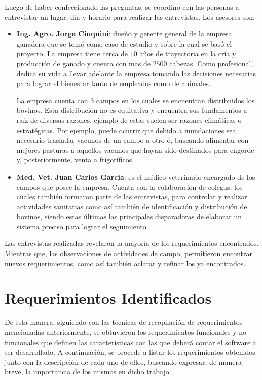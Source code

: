 \documentclass[11pt,oneside]{book}
\begin{document}
\newpage
Luego de haber confeccionado las preguntas, se coordino con las personas a entrevistar un lugar, día y horario para realizar las entrevistas. Los asesores son:
\begin{itemize}
\item \textbf{Ing. Agro. Jorge Cinquini}: dueño y gerente general de la empresa ganadera que se tomó como caso de estudio y sobre la cual se basó el proyecto. La empresa tiene cerca de $10$ años de trayectoria en la cría y producción de ganado y cuenta con mas de $2500$ cabezas. Como profesional, dedica su vida a llevar adelante la empresa tomando las decisiones necesarias para lograr el bienestar tanto de empleados como de animales. 

La empresa cuenta con $3$ campos en los cuales se encuentran distribuidos los bovinos. Esta distribución no es equitativa y encuentra sus fundamentos a raíz de diversas razones, ejemplo de estas suelen ser razones climáticas o estratégicas. Por ejemplo, puede ocurrir que debido a inundaciones sea necesario trasladar vacunos de un campo a otro ó, buscando alimentar con mejores pasturas a aquellos vacunos que hayan sido destinados para engorde y, posteriormente, venta a frigoríficos.

\item \textbf{Med. Vet. Juan Carlos Garcia}: es el médico veterinario encargado de los campos que posee la empresa. Cuenta con la colaboración de colegas, los cuales también formaron parte de las entrevistas, para controlar y realizar actividades sanitarias como así también de identificación y distribución de bovinos, siendo estas últimas las principales disparadoras de elaborar un sistema preciso para lograr el seguimiento.
\end{itemize} 

Las entrevistas realizadas revelaron la mayoría de los requerimientos encontrados. Mientras que, las observaciones de actividades de campo, permitieron encontrar nuevos requerimientos, como así también aclarar y refinar los ya encontrados.

\section{Requerimientos Identificados}
De esta manera, siguiendo con las técnicas de recopilación de requerimientos mencionadas anteriormente, se obtuvieron los requerimientos funcionales y no funcionales que definen las características con las que deberá contar el software a ser desarrollado. A continuación, se procede a listar los requerimientos obtenidos junto con la descripción de cada uno de ellos, buscando expresar, de manera breve, la importancia de los mismos en dicho trabajo. 
\end{document}
